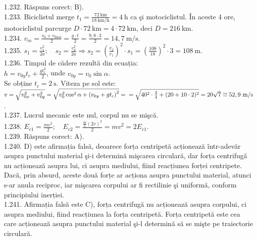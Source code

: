 1.232. Răspuns corect: B).\\

1.233. Biciclistul merge $t_{1}=\frac{72 \mathrm{~km}}{18 \mathrm{~km} / \mathrm{h}}=4 \mathrm{~h}$ ca şi motociclistul. În aceste 4 ore, motociclistul parcurge $D \cdot 72 \mathrm{~km}=4 \cdot 72 \mathrm{~km}$, deci $D=216 \mathrm{~km}$.\\

1.234. $v_{m}=\frac{v_{0}+v_{\text {final}}}{2}=\frac{g \cdot t}{2}=\frac{9,8 \cdot 3}{2}=14,7 \mathrm{~m} / \mathrm{s}$.\\

1.235. $s_{1}=\frac{v_{1}^{2}}{2 a}; \quad s_{2}=\frac{v_{2}^{2}}{2 a} \Rightarrow s_{2}=\left(\frac{v_{2}}{v_{1}}\right)^{2} \cdot s_{1}=\left(\frac{108}{18}\right)^{2} \cdot 3=108 \mathrm{~m}$.\\

1.236. Timpul de cădere rezultă din ecuația:\\ $h=v_{0 y} t_{c}+\frac{g t_{c}^{2}}{2}$, unde $v_{0 y}=v_{0} \sin \alpha$.\\ Se obține $t_{c}=2 \mathrm{~s}$. Viteza pe sol este:\\ $v=\sqrt{v_{0 x}^{2}+v_{0 y}^{2}}=\sqrt{v_{0}^{2} \cos ^{2} \alpha+\left(v_{0 y}+g t_{c}\right)^{2}}=\\ =\sqrt{40^{2} \cdot \frac{3}{4}+(20+10 \cdot 2)^{2}}=20 \sqrt{7} \cong 52,9 \mathrm{~m} / \mathrm{s}$.\\

1.237. Lucrul mecanic este nul, corpul nu se mişcă.\\

1.238. $E_{c 1}=\frac{m v^{2}}{2}; \quad E_{c 2}=\frac{\frac{m}{2}(2 v)^{2}}{2}=m v^{2}=2 E_{c 1}$.\\

1.239. Răspuns corect: A).\\

1.240. D) este afirmația falsă, deoarece forța centripetă acționează într-adevăr asupra punctului material şi-i determină mişcarea circulară, dar forța centrifugă nu acționează asupra lui, ci asupra mediului, fiind reacțiunea forței centripete. Dacă, prin absurd, aceste două forțe ar acționa asupra punctului material, atunci s-ar anula reciproc, iar mişcarea corpului ar fi rectilinie şi uniformă, conform principiului inerției.\\

1.241. Afirmația falsă este C), forța centrifugă nu acționează asupra corpului, ci asupra mediului, fiind reacțiunea la forța centripetă. Forța centripetă este cea care acționează asupra punctului material şi-l determină să se mişte pe traiectorie circulară.\\

